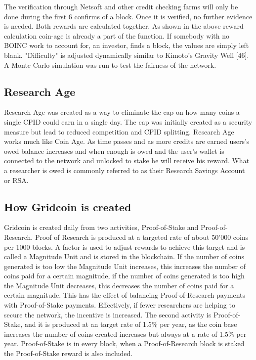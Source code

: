 The verification through Netsoft and other credit checking farms will only be done during the first 6 confirms of a block. Once it is verified, no further evidence is needed. Both rewards are calculated together. As shown in the above reward calculation coin-age is already a part of the function. If somebody with no BOINC work to account for, an investor, finds a block, the values are simply left blank. "Difficulty" is adjusted dynamically similar to Kimoto's Gravity Well [46]. A Monte Carlo simulation was run to test the fairness of the network.

\subsection{Research Age}

Research Age was created as a way to eliminate the cap on how many coins a single CPID could earn in a single day. The cap was initially created as a security measure but lead to reduced competition and CPID splitting. Research Age works much like Coin Age. As time passes and as more credits are earned users's owed balance increases and when enough is owed and the user's wallet is connected to the network and unlocked to stake he will receive his reward. What a researcher is owed is commonly referred to as their Research Savings Account or RSA.


\subsection{How Gridcoin is created}

Gridcoin is created daily from two activities, Proof-of-Stake and Proof-of-Research. Proof of Research is produced at a targeted rate of about 50'000 coins per 1000 blocks. A factor is used to adjust rewards to achieve this target and is called a Magnitude Unit and is stored in the blockchain. If the number of coins generated is too low the Magnitude Unit increases, this increases the number of coins paid for a certain magnitude, if the number of coins generated is too high the Magnitude Unit decreases, this decreases the number of coins paid for a certain magnitude. This has the effect of balancing Proof-of-Research payments with Proof-of-Stake payments. Effectively, if fewer researchers are helping to secure the network, the incentive is increased. The second activity is Proof-of-Stake, and it is produced at an target rate of 1.5\% per year, as the coin base increases the number of coins created increases but always at a rate of 1.5\% per year. Proof-of-Stake is in every block, when a Proof-of-Research block is staked the Proof-of-Stake reward is also included.

